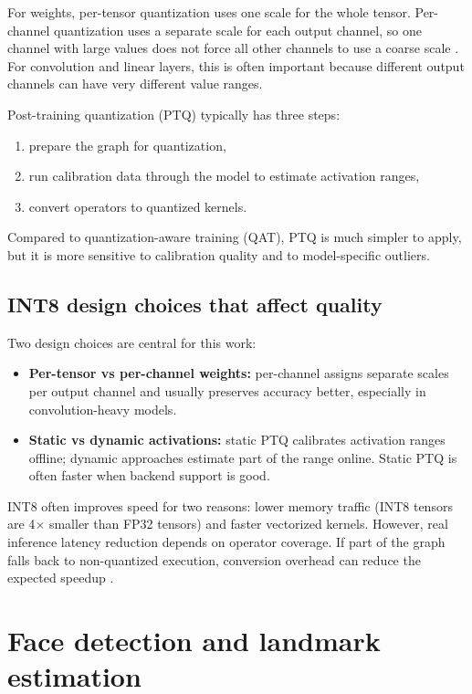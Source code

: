 For weights, per-tensor quantization uses one scale for the whole tensor.
Per-channel quantization uses a separate scale for each output channel, so one
channel with large values does not force all other channels to use a coarse
scale \cite{jacob2018quantization}. For convolution and linear layers, this is
often important because different output channels can have very different value
ranges.

Post-training quantization (PTQ) typically has three steps:
\begin{enumerate}
    \item prepare the graph for quantization,
    \item run calibration data through the model to estimate activation ranges,
    \item convert operators to quantized kernels.
\end{enumerate}

Compared to quantization-aware training (QAT), PTQ is much simpler to apply,
but it is more sensitive to calibration quality and to model-specific outliers.

\subsection{INT8 design choices that affect quality}

Two design choices are central for this work:
\begin{itemize}
    \item \textbf{Per-tensor vs per-channel weights:} per-channel assigns
          separate scales per output channel and usually preserves accuracy
          better, especially in convolution-heavy models.
    \item \textbf{Static vs dynamic activations:} static PTQ calibrates
          activation ranges offline; dynamic approaches estimate part of the
          range online. Static PTQ is often faster when backend support is
          good.
\end{itemize}

INT8 often improves speed for two reasons: lower memory traffic (INT8 tensors
are 4$\times$ smaller than FP32 tensors) and faster vectorized kernels. However, real
inference latency reduction depends on operator coverage. If part of the graph falls back
to non-quantized execution, conversion overhead can reduce the expected speedup
\cite{krishnamoorthi2018quantizing}.

\section{Face detection and landmark estimation}

